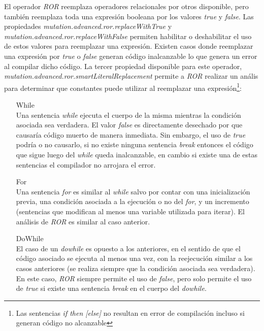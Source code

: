 El operador \emph{ROR} reemplaza operadores relacionales por otros disponible, pero tambi\'en reemplaza toda una expresi\'on booleana por los valores \emph{true} y \emph{false}. Las propiedades \emph{mutation.advanced.ror.replaceWithTrue} y \emph{mutation.advanced.ror.replaceWithFalse} permiten habilitar o deshabilitar el uso de estos valores para reemplazar una expresi\'on. Existen casos donde reemplazar una expresi\'on por \emph{true} o \emph{false} generan c\'odigo inalcanzable lo que genera un error al compilar dicho c\'odigo. La tercer propiedad disponible para este operador, \emph{mutation.advanced.ror.smartLiteralReplacement} permite a \emph{ROR} realizar un an\'alis para determinar que constantes puede utilizar al reemplazar una expresi\'on\footnote{Las sentencias \emph{if then [else]} no resultan en error de compilaci\'on incluso si generan c\'odigo no alcanzable}:
\begin{enumerate}[leftmargin=.75cm,align=left,style=nextline]
	\item[While]\mbox{}\\ Una sentencia \emph{while} ejecuta el cuerpo de la misma mientras la condici\'on asociada sea verdadera. El valor \emph{false} es directamente desechado por que causar\'ia c\'odigo muerto de manera inmediata. Sin embargo, el uso de \emph{true} podr\'ia o no causarlo, si no existe ninguna sentencia \emph{break} entonces el c\'odigo que sigue luego del \emph{while} queda inalcanzable, en cambio si existe una de estas sentencias el compilador no arrojara el error.
	
	\item[For]\mbox{}\\ Una sentencia \emph{for} es similar al \emph{while} salvo por contar con una inicializaci\'on previa, una condici\'on asociada a la ejecuci\'on o no del \emph{for}, y un incremento (sentencias que modifican al menos una variable utilizada para iterar). El an\'alisis de \emph{ROR} es similar al caso anterior.
	
	\item[DoWhile]\mbox{}\\ El caso de un \emph{dowhile} es opuesto a los anteriores, en el sentido de que el c\'odigo asociado se ejecuta al menos una vez, con la reejecuci\'on similar a los casos anteriores (se realiza siempre que la condici\'on asociada sea verdadera). En este caso, \emph{ROR} siempre permite el uso de \emph{false}, pero solo permite el uso de \emph{true} si existe una sentencia \emph{break} en el cuerpo del \emph{dowhile}.
\end{enumerate}

